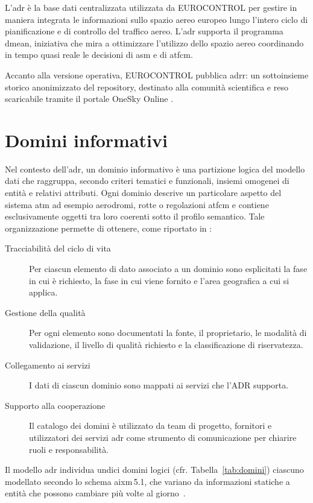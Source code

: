 L'\gls{adr} è la base dati centralizzata utilizzata da EUROCONTROL per gestire in maniera integrata le informazioni sullo spazio aereo europeo lungo l’intero ciclo di pianificazione e di controllo del traffico aereo.  
L’\gls{adr} supporta il programma \gls{dmean}, iniziativa che mira a ottimizzare l’utilizzo dello spazio aereo coordinando in tempo quasi reale le decisioni di \gls{asm} e di \gls{atfcm}.

Accanto alla versione operativa, EUROCONTROL pubblica \gls{adrr}: un sottoinsieme storico anonimizzato del repository, destinato alla comunità scientifica e reso scaricabile tramite il portale OneSky Online \cite{eurocontrol2025onesky}.

\section{Domini informativi}
Nel contesto dell’\gls{adr}, un dominio informativo è una partizione logica del modello dati che raggruppa, secondo criteri tematici e funzionali, insiemi omogenei di entità e relativi attributi.  
Ogni dominio descrive un particolare aspetto del sistema \gls{atm} ad esempio aerodromi, rotte o regolazioni \gls{atfcm} e contiene esclusivamente oggetti tra loro coerenti sotto il profilo semantico. Tale organizzazione permette di ottenere, come riportato in \cite{eurocontrol2025adr}:
\begin{description}
  \item[Tracciabilità del ciclo di vita] Per ciascun elemento di dato associato a un dominio sono esplicitati
  la fase in cui è richiesto, la fase in cui viene fornito
  e l'area geografica a cui si applica.
  \item[Gestione della qualità] Per ogni elemento sono documentati la fonte,
  il proprietario, le modalità di validazione, il livello di qualità richiesto e la classificazione di
  riservatezza.
  \item[Collegamento ai servizi] I dati di ciascun dominio sono mappati ai servizi che l'ADR supporta.
  \item[Supporto alla cooperazione] Il catalogo dei domini è utilizzato da team di progetto, fornitori e utilizzatori dei servizi \gls{adr} come strumento di comunicazione per chiarire ruoli e responsabilità.
\end{description}

Il modello \gls{adr} individua undici domini logici (cfr. Tabella~\ref{tab:domini}) ciascuno modellato secondo lo schema \gls{aixm}\,5.1, che variano da informazioni statiche a entità che possono cambiare più volte al giorno~\citep{eurocontrol2025adr}.

